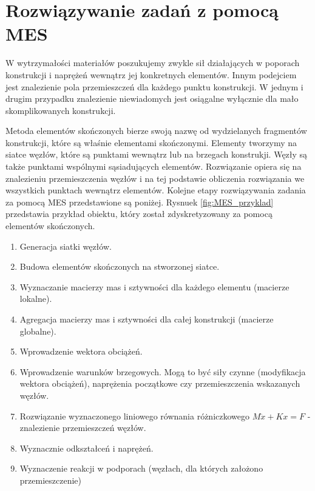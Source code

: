 
\section{Rozwiązywanie zadań z  pomocą MES}
\label{sec:rozwiazwyanie_zadan}

W wytrzymałości materiałów poszukujemy zwykle sił działających w poporach konstrukcji i naprężeń wewnątrz jej konkretnych elementów. Innym podejciem jest znalezienie pola przemieszczeń dla każdego punktu konstrukcji.  W jednym i drugim przypadku znalezienie niewiadomych jest osiągalne wyłącznie dla mało skomplikowanych konstrukcji.

Metoda elementów skończonych bierze swoją nazwę od wydzielanych fragmentów konstrukcji, które są właśnie elementami skończonymi. Elementy tworzymy na siatce węzłów, które są punktami wewnątrz lub na brzegach konstrukji. Węzły są także punktami wspólnymi sąsiadujących elementów. Rozwiązanie opiera się na znalezieniu przemieszczenia węzłów i na tej podstawie obliczenia rozwiązania we wszystkich punktach wewnątrz elementów. Kolejne etapy rozwiązywania zadania za pomocą MES przedstawione są poniżej. Rysnuek \ref{fig:MES_przyklad} przedstawia przykład obiektu, który został zdyskretyzowany za pomocą elementów skończonych.

\vspace{5 mm}

\begin{enumerate}
  \item Generacja siatki węzłów.
  \item Budowa elementów skończonych na stworzonej siatce.
  \item Wyznaczanie macierzy mas i sztywności dla każdego elementu (macierze lokalne).
  \item Agregacja macierzy mas  i sztywności dla całej konstrukcji (macierze globalne).
  \item Wprowadzenie wektora obciążeń.
  \item Wprowadzenie warunków brzegowych. Mogą to być siły czynne (modyfikacja wektora obciążeń), naprężenia początkowe czy przemieszczenia wskazanych węzłów.
  \item Rozwiązanie wyznaczonego liniowego równania różniczkowego \( M \ddot x + Kx = F \) - znalezienie przemieszczeń węzłów.
  \item Wyznacznie odkształceń i naprężeń.
  \item Wyznaczenie reakcji w podporach (węzłach, dla których założono przemieszczenie)
\end{enumerate}

